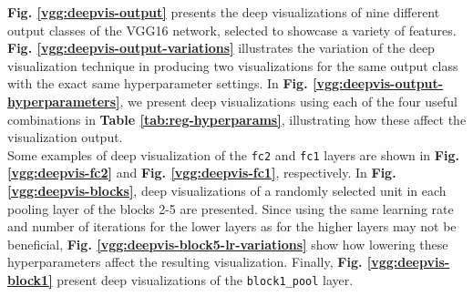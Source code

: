 \noindent \textbf{Fig. \ref{vgg:deepvis-output}} presents the deep visualizations of nine different output classes of the VGG16 network, selected to showcase a variety of features. \textbf{Fig. \ref{vgg:deepvis-output-variations}} illustrates the variation of the deep visualization technique in producing two visualizations for the same output class with the exact same hyperparameter settings. In \textbf{Fig. \ref{vgg:deepvis-output-hyperparameters}}, we present deep visualizations using each of the four useful combinations in \textbf{Table \ref{tab:reg-hyperparams}}, illustrating how these affect the visualization output. \\

\noindent Some examples of deep visualization of the \texttt{fc2} and \texttt{fc1} layers are shown in \textbf{Fig. \ref{vgg:deepvis-fc2}} and \textbf{Fig. \ref{vgg:deepvis-fc1}}, respectively. In \textbf{Fig. \ref{vgg:deepvis-blocks}}, deep visualizations of a randomly selected unit in each pooling layer of the blocks 2-5 are presented. Since using the same learning rate and number of iterations for the lower layers as for the higher layers may not be beneficial, \textbf{Fig. \ref{vgg:deepvis-block5-lr-variations}} show how lowering these hyperparameters affect the resulting visualization. Finally, \textbf{Fig. \ref{vgg:deepvis-block1}} present deep visualizations of the \texttt{block1\_pool} layer.

